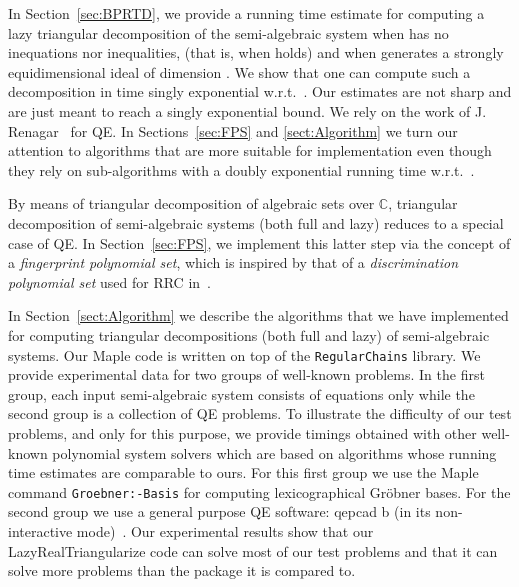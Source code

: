 \documentclass{sig-alternate}
\def\C {\ensuremath{\mathbb{C}}}
\def\C {\ensuremath{\mathbb{C}}}
\begin{document}
\smallskip{}
In Section~\ref{sec:BPRTD}, we provide a running time 
estimate for computing a lazy triangular decomposition
of the semi-algebraic system  
when   has no inequations nor inequalities,
(that is, when  holds)
and when  generates a strongly equidimensional ideal of dimension .
We show that one can compute such a decomposition
in time singly exponential w.r.t.\ .
Our estimates are not sharp and are just meant to reach
a singly exponential bound.
We rely on the work of J. Renagar~\cite{Ren92} for {\small QE}. 
In Sections~\ref{sec:FPS} and \ref{sect:Algorithm}
we turn our attention to algorithms
that are more suitable for implementation even though
they rely on sub-algorithms with a doubly exponential 
running time w.r.t.\ .


\smallskip{}
By means of triangular decomposition of algebraic sets over {\C},
triangular decomposition
of semi-algebraic systems  (both full and lazy)  reduces
to a special case of {\small QE}.
In Section~\ref{sec:FPS}, we implement this latter step 
via the concept of a {\em fingerprint polynomial set}, 
which is inspired by that of a {\em discrimination polynomial set}
used for {\small RRC} in~\cite{yhx01,Xiao09}.


\smallskip{}
In Section~\ref{sect:Algorithm} we describe the algorithms
that we have implemented for computing triangular decompositions
(both full and lazy) 
of semi-algebraic systems.
Our {\sc Maple} code is written
on top of the {\tt RegularChains} library.
We provide experimental data for two groups of well-known problems. 
In the first group, each input semi-algebraic 
system consists of equations only
while the second group is a collection of {\small QE} problems.
To illustrate the difficulty of our test problems,
and only for this purpose, 
we provide timings obtained with other well-known 
polynomial system solvers which are based on algorithms
whose running time estimates are comparable to ours.
For this first group we use the {\sc Maple}
command {\tt Groebner:-Basis} for computing
lexicographical Gr\"obner bases. 
For the second group we use 
a general purpose {\small QE} software:
{\sc qepcad b} (in its non-interactive mode)~\cite{Bro03}.
Our experimental results show that our {\sf LazyRealTriangularize}
code can solve most of our test problems 
and that it can solve more problems than the 
package it is compared to.
\end{document}
